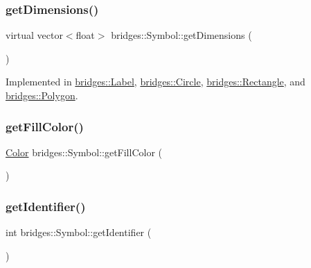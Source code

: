 \subsubsection{\texorpdfstring{get\+Dimensions()}{getDimensions()}}
{\footnotesize\ttfamily virtual vector$<$float$>$ bridges\+::\+Symbol\+::get\+Dimensions (\begin{DoxyParamCaption}{ }\end{DoxyParamCaption})\hspace{0.3cm}{\ttfamily [pure virtual]}}



Implemented in \mbox{\hyperlink{classbridges_1_1_label_a97d5638f629edbd6733b8f8572ca42ba}{bridges\+::\+Label}}, \mbox{\hyperlink{classbridges_1_1_circle_a06e97818128abf9b9caa72aa4d05a704}{bridges\+::\+Circle}}, \mbox{\hyperlink{classbridges_1_1_rectangle_a459587616a9674f6f0f02bac08589e23}{bridges\+::\+Rectangle}}, and \mbox{\hyperlink{classbridges_1_1_polygon_a6ad07473cb57633eca62a3f6832ea08c}{bridges\+::\+Polygon}}.

\mbox{\label{classbridges_1_1_symbol_affd9e9f49524a920d53a490782fab9c9}} 
\subsubsection{\texorpdfstring{get\+Fill\+Color()}{getFillColor()}}
{\footnotesize\ttfamily \mbox{\hyperlink{classbridges_1_1_color}{Color}} bridges\+::\+Symbol\+::get\+Fill\+Color (\begin{DoxyParamCaption}{ }\end{DoxyParamCaption})\hspace{0.3cm}{\ttfamily [inline]}}

\mbox{\label{classbridges_1_1_symbol_a6006dfc7fcaeff3dbead8bcf647ccff6}} 
\subsubsection{\texorpdfstring{get\+Identifier()}{getIdentifier()}}
{\footnotesize\ttfamily int bridges\+::\+Symbol\+::get\+Identifier (\begin{DoxyParamCaption}{ }\end{DoxyParamCaption})\hspace{0.3cm}{\ttfamily [inline]}}

